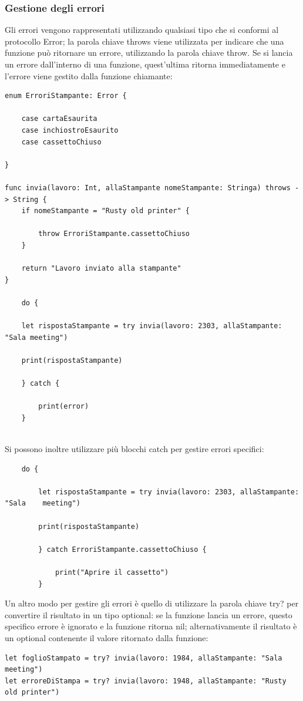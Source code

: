 \subsubsection{Gestione degli errori}
Gli errori vengono rappresentati utilizzando qualsiasi tipo che si conformi al protocollo Error; la parola chiave throws viene utilizzata per indicare che una funzione può ritornare un errore, utilizzando la parola chiave throw. Se si lancia un errore dall'interno di una funzione, quest'ultima ritorna immediatamente e l'errore viene gestito dalla funzione chiamante:
\lstset{language=[Objective]C, breakindent=40pt, breaklines}
\begin{lstlisting}
enum ErroriStampante: Error {

	case cartaEsaurita
	case inchiostroEsaurito
	case cassettoChiuso
	
}

func invia(lavoro: Int, allaStampante nomeStampante: Stringa) throws -> String {
	if nomeStampante = "Rusty old printer" {
		
		throw ErroriStampante.cassettoChiuso
	}

	return "Lavoro inviato alla stampante"
}

	do {
	
	let rispostaStampante = try invia(lavoro: 2303, allaStampante: "Sala meeting")
	
	print(rispostaStampante)
	
	} catch {
		
		print(error)
	}
	
\end{lstlisting}
Si possono inoltre utilizzare più blocchi catch per gestire errori specifici:
\lstset{language=[Objective]C, breakindent=40pt, breaklines}
\begin{lstlisting}
	do {
	
		let rispostaStampante = try invia(lavoro: 2303, allaStampante: "Sala 	meeting")
	
		print(rispostaStampante)
	
		} catch ErroriStampante.cassettoChiuso {
		
			print("Aprire il cassetto")
		}
\end{lstlisting}
Un altro modo per gestire gli errori è quello di utilizzare la parola chiave try? per convertire il risultato in un tipo optional: se la funzione lancia un errore, questo specifico errore è ignorato e la funzione ritorna nil; alternativamente il risultato è un optional contenente il valore ritornato dalla funzione:
\lstset{language=[Objective]C, breakindent=40pt, breaklines}
\begin{lstlisting}
let foglioStampato = try? invia(lavoro: 1984, allaStampante: "Sala meeting")
let erroreDiStampa = try? invia(lavoro: 1948, allaStampante: "Rusty old printer")
\end{lstlisting}
